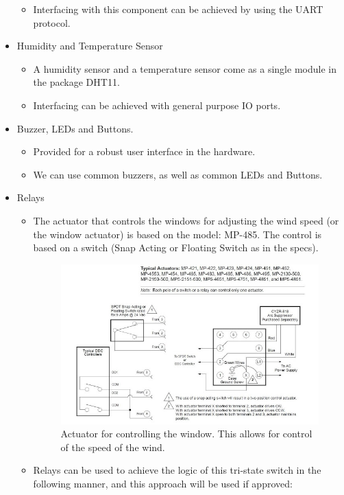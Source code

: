 \begin{itemize}
\begin{itemize}
					\item Interfacing with this component can be achieved by using the UART protocol.
				\end{itemize}
				\item Humidity and Temperature Sensor
				\begin{itemize}
					\item A humidity sensor and a temperature sensor come as a single module in the package DHT11.
					\item Interfacing can be achieved with general purpose IO ports.
				\end{itemize}
				\item Buzzer, LEDs and Buttons.
				\begin{itemize}
					\item Provided for a robust user interface in the hardware.
					\item We can use common buzzers, as well as common LEDs and Buttons.
				\end{itemize}
				\item Relays
				\begin{itemize}
					\item The actuator that controls the windows for adjusting the wind speed (or the window actuator) is based on the model: MP-485. The control is based on a switch (Snap Acting or Floating Switch as in the specs).
					\begin{figure}[H]
						\centering
							\includegraphics[scale=0.60]{img/window-actuator}
						\caption{Actuator for controlling the window. This allows for control of the speed of the wind.}
					\end{figure}
					\item Relays can be used to achieve the logic of this tri-state switch in the following manner, and this approach will be used if approved:

\end{itemize}
\end{itemize}
